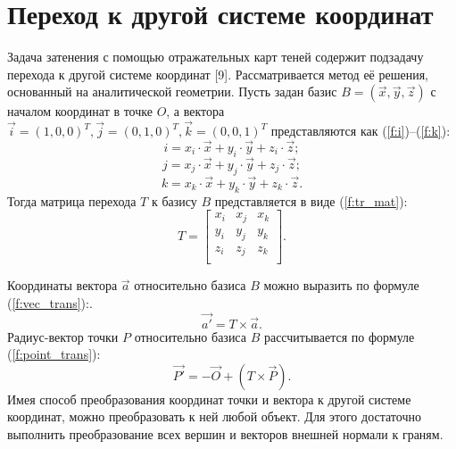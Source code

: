 \section{Переход к другой системе координат} {
    Задача затенения с помощью отражательных карт теней содержит подзадачу
    перехода к другой системе координат [9].
    Рассматривается метод её решения, основанный на аналитической геометрии.
    Пусть задан базис $B = (\vec{x}, \vec{y}, \vec{z})$
    с началом координат в точке $O$,
    а вектора $\vec{i} = (1, 0, 0)^T, \vec{j} = (0, 1, 0)^T, \vec{k} = (0, 0, 1)^T$
    представляются как (\ref{f:i})--(\ref{f:k}):
    \begin{equation}
        \label{f:i}
        i = x_i \cdot \vec{x} + y_i \cdot \vec{y} + z_i \cdot \vec{z};
    \end{equation}
     \begin{equation}
        \label{f:j}
        j = x_j \cdot \vec{x} + y_j \cdot \vec{y} + z_j \cdot \vec{z};
    \end{equation}
     \begin{equation}
        \label{f:k}
        k = x_k \cdot \vec{x} + y_k \cdot \vec{y} + z_k \cdot \vec{z}.
    \end{equation}
    Тогда матрица перехода $T$ к базису $B$ представляется в виде (\ref{f:tr_mat}): \\
    \begin{equation}
        T = \begin{bmatrix}
            \label{f:tr_mat}
            x_i & x_j & x_k \\
            y_i & y_j & y_k \\
            z_i & z_j & z_k \\
        \end{bmatrix}.
    \end{equation}
    
    Координаты вектора $\vec{a}$ относительно базиса $B$ можно выразить по формуле (\ref{f:vec_trans}):.
    \begin{equation}
        \label{f:vec_trans}
        \vec{a'} = T \times \vec{a}.
    \end{equation}
    Радиус-вектор точки $P$ относительно базиса $B$
    рассчитывается по формуле (\ref{f:point_trans}):
    \begin{equation}
        \label{f:point_trans}
        \vec{P'} = -\vec{O} + (T \times \vec{P}).
    \end{equation}
    Имея способ преобразования координат точки и вектора к другой системе координат,
    можно преобразовать к ней любой объект.
    Для этого достаточно выполнить преобразование всех вершин и
    векторов внешней нормали к граням.
}